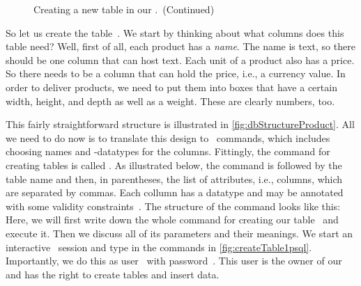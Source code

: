 \begin{figure}%
\ContinuedFloat%
\centering%
%
%
%
\FloatBarrier%
%
%
%
\FloatBarrier%
%
%
%
\FloatBarrier%
%
%
%
\caption{Creating a new table in our \db.~(Continued)}%
\label{fig:createTableProduct:B}%
\end{figure}%
%
So let us create the table~.
We start by thinking about what columns does this table need?
Well, first of all, each product has a \emph{name}.
The name is text, so there should be one column that can host text.
Each unit of a product also has a price.
So there needs to be a column that can hold the price, i.e., a currency value.
In order to deliver products, we need to put them into boxes that have a certain width, height, and depth as well as a weight.
These are clearly numbers, too.

This fairly straightforward structure is illustrated in \cref{fig:dbStructureProduct}.
All we need to do now is to translate this design to \sql\ commands, which includes choosing names and \sql-datatypes for the columns.
Fittingly, the command for creating tables is called .
As illustrated below, the command is followed by the table name and then, in parentheses, the list of attributes, i.e., columns, which are separated by commas.
Each collumn has a datatype and may be annotated with some validity constraints~\cite{PGDG:PD:CT2}.
The structure of the command looks like this:%
%
%
%
Here, we will first write down the whole command for creating our table~ and execute it.
Then we discuss all of its parameters and their meanings.
We start an interactive \psql\ session and type in the commands in \cref{fig:createTable1psql}.
Importantly, we do this as user~ with password~.
This user is the owner of our \db\  and has the right to create tables and insert data.

